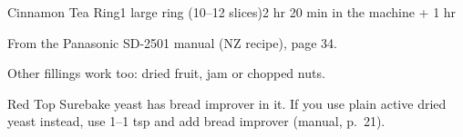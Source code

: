 \begin{recipebox}{Cinnamon Tea Ring}{1 large ring (10--12 slices)}{2 hr 20 min in the machine + 1 hr}
\begin{notelist}
  \item From the Panasonic SD-2501 manual (NZ recipe), page 34.
  \item Other fillings work too: dried fruit, jam or chopped nuts.
  \item Red Top Surebake yeast has bread improver in it. If you use plain active dried yeast instead, use 1--1 tsp and add bread improver (manual, p.~21).
\end{notelist}

\end{recipebox}

